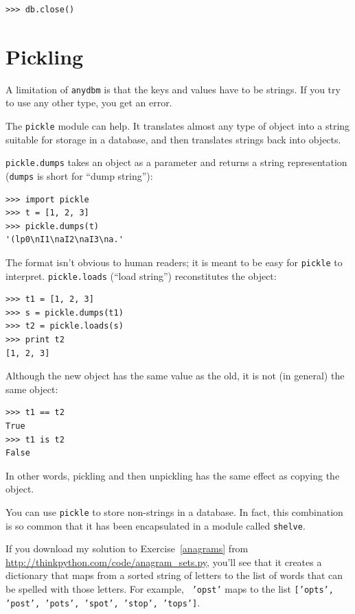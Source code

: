 \documentclass[10pt]{book}
\begin{document}
\begin{CJK}{UTF8}{gbsn}
\begin{verbatim}
>>> db.close()
\end{verbatim}
%


\section{Pickling}

A limitation of {\tt anydbm} is that the keys and values have
to be strings.  If you try to use any other type, you get an
error.

The {\tt pickle} module can help.  It translates
almost any type of object into a string suitable for storage in a
database, and then translates strings back into objects.

{\tt pickle.dumps} takes an object as a parameter and returns
a string representation ({\tt dumps} is short for ``dump string''):

\begin{verbatim}
>>> import pickle
>>> t = [1, 2, 3]
>>> pickle.dumps(t)
'(lp0\nI1\naI2\naI3\na.'
\end{verbatim}
%
The format isn't obvious to human readers; it is meant to be
easy for {\tt pickle} to interpret.  {\tt pickle.loads}
(``load string'') reconstitutes the object:

\begin{verbatim}
>>> t1 = [1, 2, 3]
>>> s = pickle.dumps(t1)
>>> t2 = pickle.loads(s)
>>> print t2
[1, 2, 3]
\end{verbatim}
%
Although the new object has the same value as the old, it is
not (in general) the same object:

\begin{verbatim}
>>> t1 == t2
True
>>> t1 is t2
False
\end{verbatim}
%
In other words, pickling and then unpickling has the same effect
as copying the object.

You can use {\tt pickle} to store non-strings in a database.
In fact, this combination is so common that it has been
encapsulated in a module called {\tt shelve}.  


\begin{exercise}

If you download my solution to Exercise~\ref{anagrams} from
\url{http://thinkpython.com/code/anagram_sets.py}, you'll see that it creates
a dictionary that maps from a sorted string of letters to the list of
words that can be spelled with those letters.  For example, {\tt
  'opst'} maps to the list {\tt ['opts', 'post', 'pots', 'spot',
    'stop', 'tops']}.


\end{exercise}
\end{CJK}
\end{document}
